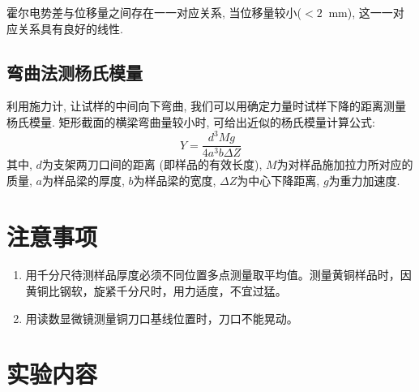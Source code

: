 \documentclass[11pt]{article}
\newcommand*{\unit}[1]{\mathop{}\!\mathrm{#1}}
\begin{document}
霍尔电势差与位移量之间存在一一对应关系, 当位移量较小($<2\unit{mm}$), 这一一对应关系具有良好的线性. 

\subsection{弯曲法测杨氏模量}

利用施力计, 让试样的中间向下弯曲, 我们可以用确定力量时试样下降的距离测量杨氏模量. 矩形截面的横梁弯曲量较小时, 可给出近似的杨氏模量计算公式: 
\[
    Y = \frac{d^{3}Mg}{4a^{3}b\Delta Z}
\]
其中, $d$为支架两刀口间的距离 (即样品的有效长度), $M$为对样品施加拉力所对应的质量, $a$为样品梁的厚度, $b$为样品梁的宽度, $\Delta Z$为中心下降距离, $g$为重力加速度. 

\section{注意事项}

\begin{enumerate}
    \item 用千分尺待测样品厚度必须不同位置多点测量取平均值。测量黄铜样品时，因黄铜比钢软，旋紧千分尺时，用力适度，不宜过猛。
    \item 用读数显微镜测量铜刀口基线位置时，刀口不能晃动。
\end{enumerate}

\section{实验内容}
\end{document}
